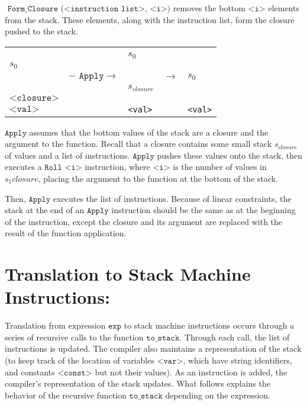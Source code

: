 \documentclass[11pt]{article}
\begin{document}
$\texttt{  Form\_Closure (<instruction list>,  <i>)}$ removes the bottom $\texttt{<i>}$ elements from the stack. These elements, along with the instruction list, form the closure pushed to the stack.

\begin{center}
  \begin{tabular}{|P{2.5cm}|P{2.5cm}|P{2.5cm}|P{1cm}|P{2.5cm}|}
      
    &&&&\\ 
    &&$s_0$&&\\
    $s_0$&&&&\\ 
    & $- \texttt{  Apply} \rightarrow$ &&  $\rightarrow$ & $s_0$\\ 
    &&$s_{closure}$&&\\ 
    $\texttt{<closure>}$&&&&\\ 
    $\texttt{<val>}$&&\texttt{<val>}&& \texttt{<val>} \\
      
  \end{tabular}
\end{center}

$\texttt{Apply}$ assumes that the bottom values of the stack are a closure and the argument to the function. Recall that a closure contains some small stack $s_{closure}$ of values and a list of instructions. $\texttt{Apply}$ pushes these values onto the stack, then executes a $\texttt{Roll <i>}$ instruction, where $\texttt{<i>}$ is the number of values in $s_1{closure}$, placing the argument to the function at the bottom of the stack.

Then, $\texttt{Apply}$ executes the list of instructions. Because of linear constraints, the stack at the end of an $\texttt{Apply}$ instruction should be the same as at the beginning of the instruction, except the closure and its argument are replaced with the result of the function application.

\section*{Translation to Stack Machine Instructions:}

Translation from expression $\texttt{exp}$ to stack machine instructions occurs through a series of recursive calls to the function $\texttt{to\_stack}$. Through each call, the list of instructions is updated. The compiler also maintains a representation of the stack (to keep track of the location of variables $\texttt{<var>}$, which have string identifiers, and constants $\texttt{<const>}$ but not their values). As an instruction is added, the compiler's representation of the stack updates. What follows explains the behavior of the recursive function $\texttt{to\_stack}$ depending on the expression.
\end{document}
